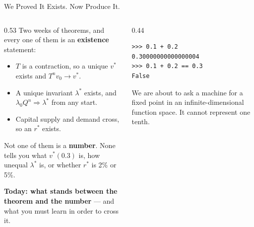 \begin{frame}[fragile]{We Proved It Exists. Now Produce It.}
\begin{columns}[T]
\begin{column}{0.53\textwidth}
\small
Two weeks of theorems, and every one of them is an \textbf{existence} statement:
\begin{itemize}\footnotesize
  \item $T$ is a contraction, so a unique $v^*$ exists and $T^n v_0 \to v^*$.
  \item A unique invariant $\lambda^*$ exists, and $\lambda_0 Q^n \Rightarrow \lambda^*$ from any start.
  \item Capital supply and demand cross, so an $r^*$ exists.
\end{itemize}
\medskip
Not one of them is a \textbf{number}. None tells you what $v^*(0.3)$ is, how unequal $\lambda^*$ is, or whether $r^*$ is 2\% or 5\%.
\medskip

\textbf{Today: what stands between the theorem and the number} --- and what you must learn in order to cross it.
\end{column}
\begin{column}{0.44\textwidth}
\begin{lstlisting}
>>> 0.1 + 0.2
0.30000000000000004
>>> 0.1 + 0.2 == 0.3
False
\end{lstlisting}
\vspace{-1mm}
\begin{cautionbox}\footnotesize
We are about to ask a machine for a fixed point in an infinite-dimensional function space. It cannot represent one tenth.
\end{cautionbox}
\end{column}
\end{columns}
\end{frame}


